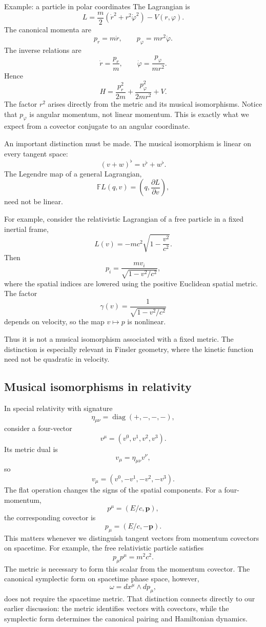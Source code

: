 Example: a particle in polar coordinates
The Lagrangian is
\[
L=\frac m2(\dot r^2+r^2\dot\varphi^2)-V(r,\varphi).
\]
The canonical momenta are
\[
p_r=m\dot r,
\qquad
p_\varphi=mr^2\dot\varphi.
\]
The inverse relations are
\[
\dot r=\frac{p_r}{m},
\qquad
\dot\varphi=\frac{p_\varphi}{mr^2}.
\]
Hence
\[
\boxed{
H=\frac{p_r^2}{2m}
+\frac{p_\varphi^2}{2mr^2}+V.
}
\]
The factor \(r^2\) arises directly from the metric and its musical
isomorphisms.
Notice that \(p_\varphi\) is angular momentum, not linear momentum. This is
exactly what we expect from a covector conjugate to an angular coordinate.

An important distinction must be made.
The musical isomorphism is linear on every tangent space:
\[
(v+w)^\flat=v^\flat+w^\flat.
\]
The Legendre map of a general Lagrangian,
\[
\mathbb FL(q,v)
=\left(q,\frac{\partial L}{\partial v}\right),
\]
need not be linear.

For example, consider the relativistic Lagrangian of a free particle in a fixed
inertial frame,
\[
L(v)=-mc^2\sqrt{1-\frac{v^2}{c^2}}.
\]
Then
\[
p_i=\frac{mv_i}{\sqrt{1-v^2/c^2}},
\]
where the spatial indices are lowered using the positive Euclidean spatial
metric.
The factor
\[
\gamma(v)=\frac1{\sqrt{1-v^2/c^2}}
\]
depends on velocity, so the map \(v\mapsto p\) is nonlinear.

Thus it is not a musical isomorphism associated with a fixed metric.
The distinction is especially relevant in Finsler geometry, where the kinetic
function need not be quadratic in velocity.

\subsection{ Musical isomorphisms in relativity}
In special relativity with signature
\[
\eta_{\mu\nu}=\operatorname{diag}(+,-,-,-),
\]
consider a four-vector
\[
v^\mu=(v^0,v^1,v^2,v^3).
\]
Its metric dual is
\[
v_\mu=\eta_{\mu\nu}v^\nu,
\]
so
\[
\boxed{
v_\mu=(v^0,-v^1,-v^2,-v^3).
}
\]
The flat operation changes the signs of the spatial components.
For a four-momentum,
\[
p^\mu=(E/c,\mathbf p),
\]
the corresponding covector is
\[
p_\mu=(E/c,-\mathbf p).
\]
This matters whenever we distinguish tangent vectors from momentum covectors on
spacetime.
For example, the free relativistic particle satisfies
\[
p_\mu p^\mu=m^2c^2.
\]
The metric is necessary to form this scalar from the momentum covector.
The canonical symplectic form on spacetime phase space, however,
\[
\omega=dx^\mu\wedge dp_\mu,
\]
does not require the spacetime metric.
That distinction connects directly to our earlier discussion: the metric
identifies vectors with covectors, while the symplectic form determines the
canonical pairing and Hamiltonian dynamics.

